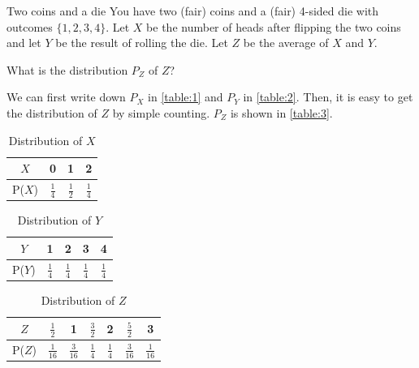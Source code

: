\documentclass[a4paper,10pt]{article}
\begin{document}


\begin{nproblem}{7}{Two coins and a die}
You have two (fair) coins and a (fair) 4-sided die with outcomes $\{1,2,3,4\}$. Let $X$ be the number of heads after flipping the two coins and let $Y$ be the result of rolling the die. Let $Z$ be the average of $X$ and $Y$.
\end{nproblem}

\begin{subproblem}{2}
What is the distribution $P_Z$ of $Z$?
\end{subproblem}

\begin{solution}
We can first write down $P_X$ in \autoref{table:1} and $P_Y$ in \autoref{table:2}. Then, it is easy to get the distribution of $Z$ by simple counting. $P_Z$ is shown in \autoref{table:3}.

\begin{table}[ht]
\centering
\caption{Distribution of $X$}
\begin{tabular}{c c c c}
\hline
$X$ & 0 & 1 & 2 \\ [0.5ex] 
\hline
P($X$)& $\frac{1}{4}$ & $\frac{1}{2}$ & $\frac{1}{4}$ \\
\hline
\end{tabular}
\label{table:1}
\end{table}

\begin{table}[ht]
\caption{Distribution of $Y$}
\centering
\begin{tabular}{c c c c c}
\hline
$Y$ & 1 & 2 & 3 & 4 \\ [0.5ex] 
\hline
P($Y$)& $\frac{1}{4}$ & $\frac{1}{4}$ & $\frac{1}{4}$ & $\frac{1}{4}$\\
\hline
\end{tabular}
\label{table:2}
\end{table}

\begin{table}[ht]
\caption{Distribution of $Z$}
\centering
\begin{tabular}{c c c c c c c}
\hline
$Z$ & $\frac{1}{2}$ & 1 & $\frac{3}{2}$ & 2 & $\frac{5}{2}$ & 3\\ [0.5ex] 
\hline
P($Z$) & $\frac{1}{16}$ & $\frac{3}{16}$ & $\frac{1}{4}$ & $\frac{1}{4}$ & $\frac{3}{16}$ & $\frac{1}{16}$\\
\hline
\end{tabular}
\label{table:3}
\end{table}
\end{solution}
\end{document}
